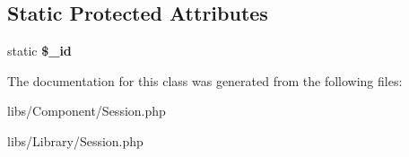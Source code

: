 \subsection*{Static Protected Attributes}
\begin{DoxyCompactItemize}
\item 
\hypertarget{classSession_a4854a1f2ded7eb0c5e9c66f2830f92d6}{
static {\bfseries \$\_\-id}}
\label{classSession_a4854a1f2ded7eb0c5e9c66f2830f92d6}

\end{DoxyCompactItemize}


The documentation for this class was generated from the following files:\begin{DoxyCompactItemize}
\item 
libs/Component/Session.php\item 
libs/Library/Session.php\end{DoxyCompactItemize}
